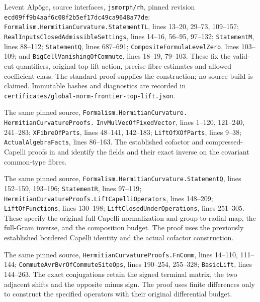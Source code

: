 Levent Alp\"oge, source interfaces, \texttt{jsmorph/rh}, pinned revision
\texttt{ecd09ff9b4aaf6c08f2b5ef17dc49ca9648a77de}:
\texttt{Formalism.HermitianCurvature.StatementTL}, lines 13--20,
29--73, 109--157; \texttt{RealInputsClosedAdmissibleSettings},
lines 14--16, 56--95, 97--132;
\texttt{StatementM}, lines 88--112;
\texttt{StatementQ}, lines 687--691;
\texttt{CompositeFormulaLevelZero}, lines 103--109; and
\texttt{BigCellVanishingOfCommute}, lines 18--19, 79--103.
These fix the valid-cut quantifiers, original top-lift action,
precise fibre estimates and allowed coefficient class.
The standard proof supplies the construction; no source build is
claimed.  Immutable hashes and diagnostics are recorded in
\texttt{certificates/global-norm-frontier-top-lift.json}.

The same pinned source, \texttt{Formalism.HermitianCurvature.}
\allowbreak\texttt{HermitianCurvatureProofs.}
\texttt{InvMulVecOfFixedVector}, lines 1--120, 121--240, 241--283;
\texttt{XFibreOfParts}, lines 48--141, 142--183;
\texttt{LiftOfXOfParts}, lines 9--38;
\texttt{ActualAlgebraFacts}, lines 86--163.
The established cofactor and compressed-Capelli proofs in
and 
identify the fields and their exact inverse on the covariant common-type fibres.

The same pinned source,
\texttt{Formalism.HermitianCurvature.StatementQ}, lines 152--159,
193--196;
\texttt{StatementR}, lines 97--119;
\texttt{HermitianCurvatureProofs.LiftCapelliOperators},
lines 148--209;
\texttt{LiftOfFunctions}, lines 130--198;
\texttt{LiftClosedUnderOperations}, lines 251--305.
These specify the original full Capelli normalization and
group-to-radial map, the full-Gram inverse, and the composition
budget.  The proof uses the previously established bordered
Capelli identity and the actual cofactor construction.

The same pinned source,
\texttt{HermitianCurvatureProofs.FnComm}, lines 14--110, 111--144;
\texttt{CommuteAvrBvrOfCommuteSiteOps}, lines 190--254, 255--328;
\texttt{BasicLift}, lines 144--263.
The exact conjugations retain the signed terminal matrix, the
two adjacent shifts and the opposite minus sign.  The proof
uses finite differences only to construct the specified
operators with their original differential budget.

